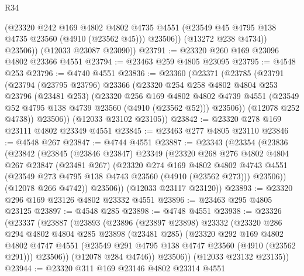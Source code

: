 \begin{lexlean}{R34}
\begin{coremodule}
              (@23320
                @242
                @169
                @4802
                @4802
                @4735
                @4551
                (@23549 @45 @4795 @138 @4735 @23560 (@4910 (@23562 @45)))
                @23506))
            (@13272 @238 @4734))
          @23506))
      (@12033 @23087 @23090))
@23791 := @23320 @260 @169 @23096 @4802 @23366 @4551
@23794 := @23463 @259 @4805 @23095
@23795 := @4548 @253
@23796 := @4740 @4551
@23836 := @23360
    (@23371
      (@23785
        (@23791
          (@23794
            (@23795 @23796)
            @23366
            (@23320
              @254
              @258
              @4802
              @4804
              @253
              @23796
              (@23481 @253)
              (@23320
                @256
                @169
                @4802
                @4802
                @4739
                @4551
                (@23549 @52 @4795 @138 @4739 @23560 (@4910 (@23562 @52)))
                @23506))
            (@12078 @252 @4738))
          @23506))
      (@12033 @23102 @23105))
@23842 := @23320 @278 @169 @23111 @4802 @23349 @4551
@23845 := @23463 @277 @4805 @23110
@23846 := @4548 @267
@23847 := @4744 @4551
@23887 := @23343
    (@23354
      (@23836
        (@23842
          (@23845
            (@23846 @23847)
            @23349
            (@23320
              @268
              @276
              @4802
              @4804
              @267
              @23847
              (@23481 @267)
              (@23320
                @274
                @169
                @4802
                @4802
                @4743
                @4551
                (@23549 @273 @4795 @138 @4743 @23560 (@4910 (@23562 @273)))
                @23506))
            (@12078 @266 @4742))
          @23506))
      (@12033 @23117 @23120))
@23893 := @23320 @296 @169 @23126 @4802 @23332 @4551
@23896 := @23463 @295 @4805 @23125
@23897 := @4548 @285
@23898 := @4748 @4551
@23938 := @23326
    (@23337
      (@23887
        (@23893
          (@23896
            (@23897 @23898)
            @23332
            (@23320
              @286
              @294
              @4802
              @4804
              @285
              @23898
              (@23481 @285)
              (@23320
                @292
                @169
                @4802
                @4802
                @4747
                @4551
                (@23549 @291 @4795 @138 @4747 @23560 (@4910 (@23562 @291)))
                @23506))
            (@12078 @284 @4746))
          @23506))
      (@12033 @23132 @23135))
@23944 := @23320 @311 @169 @23146 @4802 @23314 @4551

\end{coremodule}
\end{lexlean}
